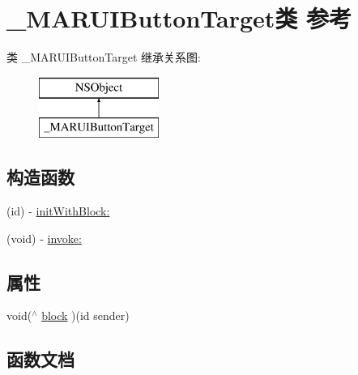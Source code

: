 \hypertarget{interface___m_a_r_u_i_button_target}{}\section{\+\_\+\+M\+A\+R\+U\+I\+Button\+Target类 参考}
\label{interface___m_a_r_u_i_button_target}
类 \+\_\+\+M\+A\+R\+U\+I\+Button\+Target 继承关系图\+:\begin{figure}[H]
\begin{center}
\leavevmode
\includegraphics[height=2.000000cm]{interface___m_a_r_u_i_button_target}
\end{center}
\end{figure}
\subsection*{构造函数}
\begin{DoxyCompactItemize}
\item 
(id) -\/ \hyperlink{interface___m_a_r_u_i_button_target_aebaa93b3c2d9c2a66d600f7eb52adf6a}{init\+With\+Block\+:}
\item 
(void) -\/ \hyperlink{interface___m_a_r_u_i_button_target_a063398d170f9daa2681fde353cc6928b}{invoke\+:}
\end{DoxyCompactItemize}
\subsection*{属性}
\begin{DoxyCompactItemize}
\item 
void($^\wedge$ \hyperlink{interface___m_a_r_u_i_button_target_ae91ea9fbd978756e94207dd93a2ee594}{block} )(id sender)
\end{DoxyCompactItemize}


\subsection{函数文档}
\mbox{\label{interface___m_a_r_u_i_button_target_aebaa93b3c2d9c2a66d600f7eb52adf6a}} 

